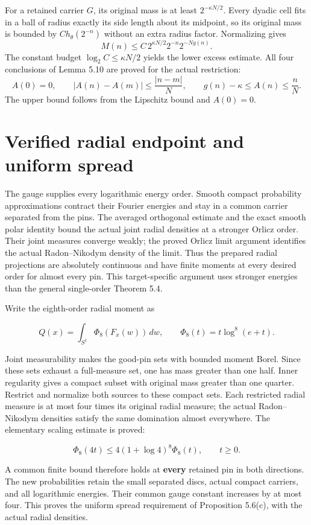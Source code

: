 \documentclass[11pt]{article}
\begin{document}
For a retained carrier $G$, its original mass is at least $2^{-\kappa N/2}$.
Every dyadic cell fits in a ball of radius exactly its side length about its
midpoint, so its original mass is bounded by $C h_\theta(2^{-n})$ without an
extra radius factor. Normalizing gives
\[
M(n)\le C\,2^{\kappa N/2}2^{-n}2^{-Ng(n)}.
\]
The constant budget $\log_2 C\le\kappa N/2$ yields the lower excess estimate.
All four conclusions of Lemma 5.10 are proved for the actual restriction:
\[
A(0)=0,\qquad |A(n)-A(m)|\le\frac{|n-m|}{N},\qquad
g(n)-\kappa\le A(n)\le\frac nN.
\]
The upper bound follows from the Lipschitz bound and $A(0)=0$.

\newpage
\section*{Verified radial endpoint and uniform spread}

The gauge supplies every logarithmic energy order. Smooth compact probability
approximations contract their Fourier energies and stay in a common carrier
separated from the pins. The averaged orthogonal estimate and the exact
smooth polar identity bound the actual joint radial densities at a stronger
Orlicz order. Their joint measures converge weakly; the proved Orlicz limit
argument identifies the actual Radon--Nikodym density of the limit. Thus the
prepared radial projections are absolutely continuous and have finite moments
at every desired order for almost every pin. This target-specific argument
uses stronger energies than the general single-order Theorem 5.4.

Write the eighth-order radial moment as

\[
Q(x)=\int_{S^1}\Phi_8(F_x(w))\,dw,
\qquad \Phi_8(t)=t\log^8(e+t).
\]


Joint measurability makes the good-pin sets with bounded moment Borel. Since
these sets exhaust a full-measure set, one has mass greater than one half.
Inner regularity gives a compact subset with original mass greater than one
quarter. Restrict and normalize both sources to these compact sets. Each
restricted radial measure is at most four times its original radial measure;
the actual Radon--Nikodym densities satisfy the same domination almost everywhere.
The elementary scaling estimate is proved:

\[
\Phi_8(4t)\le4(1+\log4)^8\Phi_8(t),\qquad t\ge0.
\]


A common finite bound therefore holds at \textbf{every} retained pin in both
directions. The new probabilities retain the small separated discs, actual
compact carriers, and all logarithmic energies. Their common gauge constant
increases by at most four. This proves the uniform spread requirement of
Proposition 5.6(c), with the actual radial densities.
\end{document}
